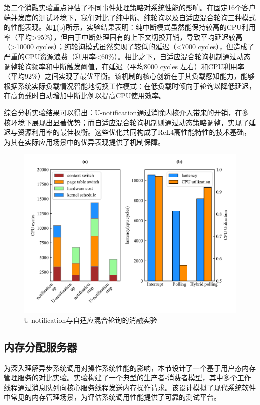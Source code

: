 第二个消融实验重点评估了不同事件处理策略对系统性能的影响。在固定16个客户端并发度的测试环境下，我们对比了纯中断、纯轮询以及自适应混合轮询三种模式的性能表现。如\ref{fig:ntfn_test}(b)所示，实验结果表明：纯中断模式虽然能保持较高的CPU利用率（平均>95\%），但由于中断处理固有的上下文切换开销，导致平均延迟较高（>10000 cycles）；纯轮询模式虽然实现了较低的延迟（<7000 cycles），但造成了严重的CPU资源浪费（利用率<60\%）。相比之下，自适应混合轮询机制通过动态调整轮询频率和中断触发阈值，在延迟（平均8000 cycles 左右）和CPU利用率（平均92\%）之间实现了最优平衡。该机制的核心创新在于其负载感知能力，能够根据系统实际负载情况智能地切换工作模式：在低负载时倾向于轮询以降低延迟，在高负载时自动增加中断比例以提高CPU使用效率。

综合分析实验结果可以得出：U-notification通过消除内核介入带来的开销，在多核环境下展现出显著优势；而自适应混合轮询机制则通过动态策略调整，实现了延迟与资源利用率的最佳权衡。这些优化共同构成了ReL4高性能特性的技术基础，为其在实际应用场景中的优异表现提供了机制保障。

\begin{figure}[htbp]
    \centering
    \includegraphics[width=1.0\textwidth]{figures/ntfn_test.pdf}
    \caption{U-notification与自适应混合轮询的消融实验}\label{fig:ntfn_test}
\end{figure}

\subsection{内存分配服务器}
为深入理解异步系统调用对操作系统性能的影响，本节设计了一个基于用户态内存管理服务的对比实验。实验构建了一个典型的生产者-消费者模型，其中多个工作线程通过消息队列向核心服务线程发送内存操作请求。该设计模拟了现代系统软件中常见的内存管理场景，为评估系统调用性能提供了可靠的测试平台。

